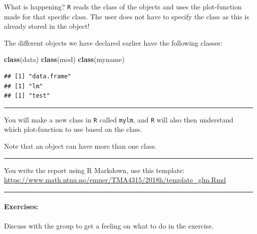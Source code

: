 \documentclass[
]{article}
\newenvironment{Shaded}{\begin{snugshade}}{\end{snugshade}}
\newcommand{\FunctionTok}[1]{\textcolor[rgb]{0.13,0.29,0.53}{\textbf{#1}}}
\newcommand{\NormalTok}[1]{#1}
\begin{document}
What is happening? \texttt{R} reads the class of the objects and uses
the plot-function made for that specific class. The user does not have
to specify the class as this is already stored in the object!

The different objects we have declared earlier have the following
classes:

\begin{Shaded}
\begin{Highlighting}[]
\FunctionTok{class}\NormalTok{(data)}
\FunctionTok{class}\NormalTok{(mod)}
\FunctionTok{class}\NormalTok{(myname)}
\end{Highlighting}
\end{Shaded}

\begin{verbatim}
## [1] "data.frame"
## [1] "lm"
## [1] "test"
\end{verbatim}

\begin{center}\rule{0.5\linewidth}{0.5pt}\end{center}

You will make a new class in \texttt{R} called \texttt{mylm}, and
\texttt{R} will also then understand which plot-function to use based on
the class.

Note that an object can have more than one class.

\begin{center}\rule{0.5\linewidth}{0.5pt}\end{center}

You write the report using R Markdown, use this template:
\url{https://www.math.ntnu.no/emner/TMA4315/2018h/template_glm.Rmd}

\begin{center}\rule{0.5\linewidth}{0.5pt}\end{center}

\hypertarget{exercises}{%
\paragraph{Exercises:}\label{exercises}}

Discuss with the group to get a feeling on what to do in the exercise.
\end{document}
